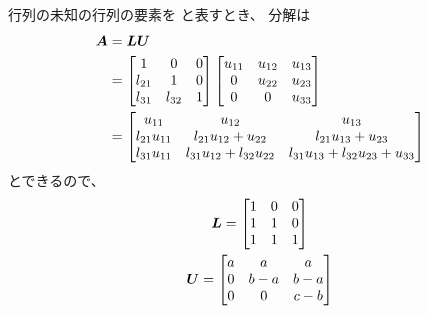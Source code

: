 \begin{ans*}
  行列\dm{\bL,\bU}の未知の行列の要素を
  と表すとき、
  \dm{\bL\bU}分解は
  \begin{align}
    \bm{A}
    &=
    \bm{L}\bm{U} \\
    &=
    \begin{bmatrix}
      1 & 0 & 0 \\
      l_{21} & 1 & 0 \\
      l_{31} & l_{32} & 1 \\
    \end{bmatrix}
    \begin{bmatrix}
      u_{11} & u_{12} & u_{13} \\
      0 & u_{22} & u_{23} \\
      0 & 0 & u_{33} \\
    \end{bmatrix} \\
    &=
    \begin{bmatrix}
      u_{11} & u_{12} & u_{13} \\
      l_{21}u_{11} & l_{21}u_{12}+u_{22} & l_{21}u_{13}+u_{23} \\
      l_{31}u_{11} & l_{31}u_{12}+l_{32}u_{22} & l_{31}u_{13}+l_{32}u_{23}+u_{33} \\
    \end{bmatrix}
  \end{align}
  とできるので、
  \begin{gather}
    \bm{L} =
    \begin{bmatrix}
      1& 0& 0 \\
      1& 1& 0 \\
      1& 1& 1 \\
    \end{bmatrix} \\
    \bm{U} =
    \begin{bmatrix}
      a& a& a \\
      0& b-a& b-a \\
      0& 0& c-b \\
    \end{bmatrix}
  \end{gather}
\end{ans*}

